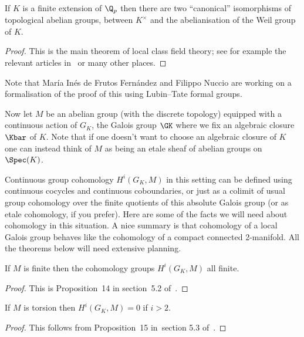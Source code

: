 \begin{theorem}\label{local_class_field_theory}\notready If $K$ is a finite extension of $\Q_p$ then there are two ``canonical'' isomorphisms of topological abelian groups, between $K^\times$ and the abelianisation of the Weil group of $K$.
\end{theorem}
\begin{proof} This is the main theorem of local class field theory; see for example the relevant articles in~\cite{cf} or many other places.
\end{proof}

Note that Mar\'ia In\'es de Frutos Fern\'andez and Filippo Nuccio are working on a formalisation of the proof of this using Lubin--Tate formal groups.

Now let $M$ be an abelian group (with the discrete topology) equipped with a continuous
action of $G_K$, the Galois group $\GK$ where we fix an algebraic closure $\Kbar$ of $K$. Note that
if one doesn't want to choose an algebraic closure of $K$ one can instead think of $M$ as being an
etale sheaf of abelian groups on $\Spec(K)$.

Continuous group cohomology $H^i(G_K,M)$ in this setting can be defined using continuous cocycles and continuous coboundaries, or just as a colimit of usual group cohomology over the finite quotients of this absolute Galois group (or as etale cohomology, if you prefer). Here are some of the facts we will need about cohomology in this situation. A nice summary is that cohomology of a local Galois group behaves like the cohomology of a compact connected 2-manifold. All the theorems below will need extensive planning.

\begin{theorem}
    \label{local_galois_coh_finite}
    \notready
    If $M$ is finite then the cohomology groups $H^i(G_K,M)$ all finite.
\end{theorem}
\begin{proof}
    This is Proposition~14 in section~5.2 of~\cite{serre-galcoh}.
\end{proof}

\begin{theorem} \label{local_galois_coh_dim_two}\notready
  If $M$ is torsion then $H^i(G_K,M)=0$ if $i>2$.
\end{theorem}
\begin{proof} This follows from Proposition~15 in~section 5.3 of~\cite{serre-galcoh}.
\end{proof}

